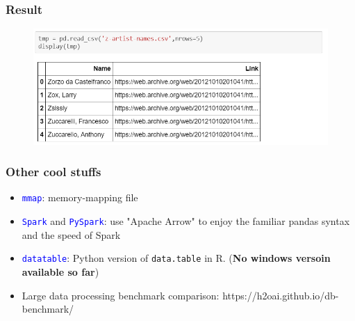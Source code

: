 \documentclass[red]{beamer}
\begin{document}
\begin{frame}
\frametitle{Result}
\begin{figure}
	\centering
	\includegraphics[width=1\linewidth]{figure/screenshot036}
\end{figure}
\end{frame}

\begin{frame}
\frametitle{Other cool stuffs}
\begin{itemize}
	\item \textcolor{blue}{\texttt{mmap}}: memory-mapping file
	\vspace{2mm}
	\item \textcolor{blue}{\texttt{Spark}} and \textcolor{blue}{\texttt{PySpark}}: use "Apache Arrow" to enjoy the familiar pandas syntax and the speed of Spark
	\vspace{2mm}
	\item \textcolor{blue}{\texttt{datatable}}: Python version of \texttt{data.table} in R. (\textbf{No windows versoin available so far})
	\vspace{2mm}
	\item Large data processing benchmark comparison:
	https://h2oai.github.io/db-benchmark/
\end{itemize}
\end{frame}
\end{document}
